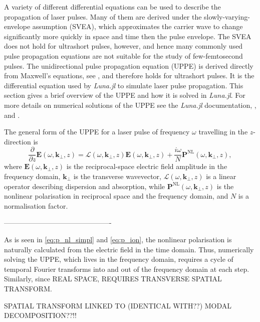 \documentclass[a4paper]{jpconf}
\begin{document}
A variety of different differential equations  can be used to describe the propagation of laser pulses. Many of them are derived under the slowly-varying- envelope assumption (SVEA), which approximates the carrier wave to change significantly more quickly in space and time then the pulse envelope. The SVEA does not hold for ultrashort pulses, however, and hence many commonly used pulse propagation equations are not suitable for the study of few-femtosecond pulses. The unidirectional pulse propagation equation (UPPE) is derived directly from Maxwell's equations, see \cite{kolesik2004}, and therefore holds for ultrashort pulses. It is the differential equation used by \textit{Luna.jl} to simulate laser pulse propagation. This section gives a brief overview of the UPPE and how it is solved in \textit{Luna.jl}. For more details on numerical solutions of the UPPE see the \textit{Luna.jl} documentation, \cite{brahms2023}, and \cite{tani2014}. \par 
The general form of the UPPE for a laser pulse of frequency $\omega$ travelling in the $z$-direction is
\begin{equation}\label{eq:UPPE}
\frac{\partial}{\partial z} \mathbf{E}(\omega, \mathbf{k}_\perp, z)= \mathcal{L}(\omega, \mathbf{k}_\perp, z)\mathbf{E}(\omega, \mathbf{k}_\perp, z) + \frac{i \omega}{N} \mathbf{P}^\text{NL}(\omega, \mathbf{k}_\perp, z),
\end{equation}
where $\mathbf{E}(\omega, \mathbf{k}_\perp, z)$ is the reciprocal-space electric field amplitude in the frequency domain, $\mathbf{k}_\perp$ is the transverse wavevector,  $\mathcal{L}(\omega, \mathbf{k}_\perp, z)$ is a linear operator describing dispersion and absorption, while $\mathbf{P}^\text{NL}(\omega, \mathbf{k}_\perp, z)$ is the nonlinear polarisation in reciprocal space and the frequency domain, and $N$ is a normalisation factor. \par 

----------------------------------------------

As is seen in \eqref{eq:p_nl_simpl} and \eqref{eq:p_ion}, the nonlinear polarisation is naturally calculated from the electric field in the time domain. Thus, numerically solving the UPPE, which lives in the frequency domain, requires a cycle of temporal Fourier transforms into and out of the frequency domain at each step. Similarly, since REAL SPACE, REQUIRES TRANSVERSE SPATIAL TRANSFORM. \par 

SPATIAL TRANSFORM LINKED TO (IDENTICAL WITH??) MODAL DECOMPOSITION??!!
\end{document}
